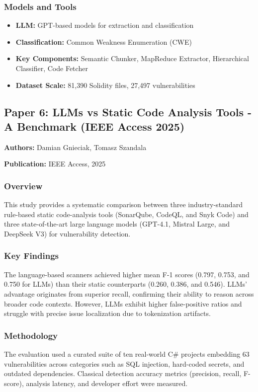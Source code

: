 \documentclass[11pt,a4paper]{article}
\begin{document}
\subsubsection{Models and Tools}
\begin{itemize}
    \item \textbf{LLM:} GPT-based models for extraction and classification
    \item \textbf{Classification:} Common Weakness Enumeration (CWE)
    \item \textbf{Key Components:} Semantic Chunker, MapReduce Extractor, Hierarchical Classifier, Code Fetcher
    \item \textbf{Dataset Scale:} 81,390 Solidity files, 27,497 vulnerabilities
\end{itemize}

\subsection{Paper 6: LLMs vs Static Code Analysis Tools - A Benchmark (IEEE Access 2025)}

\textbf{Authors:} Damian Gnieciak, Tomasz Szandala

\textbf{Publication:} IEEE Access, 2025

\subsubsection{Overview}
This study provides a systematic comparison between three industry-standard rule-based static code-analysis tools (SonarQube, CodeQL, and Snyk Code) and three state-of-the-art large language models (GPT-4.1, Mistral Large, and DeepSeek V3) for vulnerability detection.

\subsubsection{Key Findings}
The language-based scanners achieved higher mean F-1 scores (0.797, 0.753, and 0.750 for LLMs) than their static counterparts (0.260, 0.386, and 0.546). LLMs' advantage originates from superior recall, confirming their ability to reason across broader code contexts. However, LLMs exhibit higher false-positive ratios and struggle with precise issue localization due to tokenization artifacts.

\subsubsection{Methodology}
The evaluation used a curated suite of ten real-world C\# projects embedding 63 vulnerabilities across categories such as SQL injection, hard-coded secrets, and outdated dependencies. Classical detection accuracy metrics (precision, recall, F-score), analysis latency, and developer effort were measured.
\end{document}
